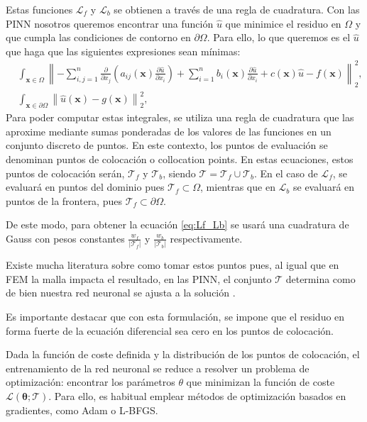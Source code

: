 \documentclass[a4paper,11pt,spanish, twoside, leqno]{tfg-uam}
\theoremstyle{definition}
\begin{document}
Estas funciones $\mathcal{L}_f$ y $\mathcal{L}_b$ se obtienen a través de una regla de cuadratura. Con las PINN nosotros queremos encontrar una función $\hat{u}$ que minimice el residuo en $\Omega$ y que cumpla las condiciones de contorno en $\partial\Omega$. Para ello, lo que queremos es el $\hat{u}$ que haga que las siguientes expresiones sean mínimas:
\begin{align*}
    &\int_{\mathbf{x} \in \Omega} \left\| -\sum_{i,j=1}^{n} \frac{\partial}{\partial x_j}\left( a_{ij}(\mathbf{x})\frac{\partial \hat{u}}{\partial x_i}\right) + \sum_{i=1}^{n} b_i(\mathbf{x})\frac{\partial \hat{u}}{\partial x_i} + c(\mathbf{x})\hat{u} - f(\mathbf{x}) \right\|_2^2, \\ 
    &\int_{\mathbf{x} \in \partial\Omega} \left\| \hat{u} (\mathbf{x}) - g(\mathbf{x})\right\|_2^2,
\end{align*}
Para poder computar estas integrales, se utiliza una regla de cuadratura que las aproxime mediante sumas ponderadas de los valores de las funciones en un conjunto discreto de puntos. En este contexto, los puntos de evaluación se denominan puntos de colocación o collocation points. En estas ecuaciones, estos puntos de colocación serán, $\mathcal{T}_f$ y $\mathcal{T}_b$, siendo $\mathcal{T}= \mathcal{T}_f\cup\mathcal{T}_b$. En el caso de $\mathcal{L}_f$, se evaluará en puntos del dominio pues $\mathcal{T}_f\subset\Omega$, mientras que en $\mathcal{L}_b$ se evaluará en puntos de la frontera, pues $\mathcal{T}_f\subset\partial\Omega$. 

De este modo, para obtener la ecuación \eqref{eq:Lf_Lb} se usará una cuadratura de Gauss con pesos constantes $\frac{w_f}{|\mathcal{T}_f|}$ y $\frac{w_b}{|\mathcal{T}_b|}$ respectivamente. 

Existe mucha literatura sobre como tomar estos puntos pues, al igual que en FEM la malla impacta el resultado, en las PINN, el conjunto $\mathcal{T}$ determina como de bien nuestra red neuronal se ajusta a la solución \cite{münzer2022curriculumtrainingbasedstrategydistributingcollocation}\cite{aikawa2024improving}\cite{matsubara2023goodlatticetrainingphysicsinformed}\cite{subramanian2022adaptiveselfsupervisionalgorithmsphysicsinformed}\cite{hou2023enhancing}.  

Es importante destacar que con esta formulación, se impone que el residuo en forma fuerte de la ecuación diferencial sea cero en los puntos de colocación. 

Dada la función de coste definida y la distribución de los puntos de colocación, el entrenamiento de la red neuronal se reduce a resolver un problema de optimización: encontrar los parámetros $\theta$ que minimizan la función de coste $\mathcal{L}(\boldsymbol{\theta}; \mathcal{T})$. Para ello, es habitual emplear métodos de optimización basados en gradientes, como Adam o L-BFGS. 
\end{document}
